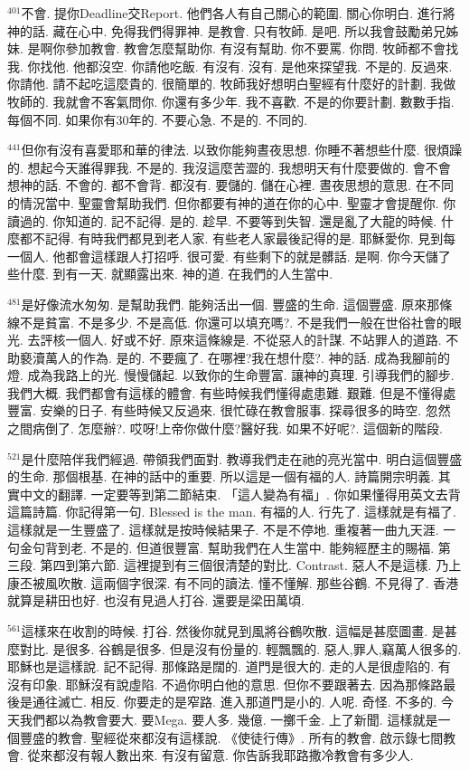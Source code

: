 \documentclass{book}
\begin{document}
$^{401}$不會.
提你Deadline交Report.
他們各人有自己關心的範圍.
關心你明白.
進行將神的話.
藏在心中.
免得我們得罪神.
是教會.
只有牧師.
是吧.
所以我會鼓勵弟兄姊妹.
是啊你參加教會.
教會怎麼幫助你.
有沒有幫助.
你不要罵.
你問.
牧師都不會找我.
你找他.
他都沒空.
你請他吃飯.
有沒有.
沒有.
是他來探望我.
不是的.
反過來.
你請他.
請不起吃這麼貴的.
很簡單的.
牧師我好想明白聖經有什麼好的計劃.
我做牧師的.
我就會不客氣問你.
你還有多少年.
我不喜歡.
不是的你要計劃.
數數手指.
每個不同.
如果你有30年的.
不要心急.
不是的.
不同的.

$^{441}$但你有沒有喜愛耶和華的律法.
以致你能夠晝夜思想.
你睡不著想些什麼.
很煩躁的.
想起今天誰得罪我.
不是的.
我沒這麼苦澀的.
我想明天有什麼要做的.
會不會想神的話.
不會的.
都不會背.
都沒有.
要儲的.
儲在心裡.
晝夜思想的意思.
在不同的情況當中.
聖靈會幫助我們.
但你都要有神的道在你的心中.
聖靈才會提醒你.
你讀過的.
你知道的.
記不記得.
是的.
趁早.
不要等到失智.
還是亂了大龍的時候.
什麼都不記得.
有時我們都見到老人家.
有些老人家最後記得的是.
耶穌愛你.
見到每一個人.
他都會這樣跟人打招呼.
很可愛.
有些剩下的就是髒話.
是啊.
你今天儲了些什麼.
到有一天.
就顯露出來.
神的道.
在我們的人生當中.

$^{481}$是好像流水匆匆.
是幫助我們.
能夠活出一個.
豐盛的生命.
這個豐盛.
原來那條線不是貧富.
不是多少.
不是高低.
你還可以填充嗎?.
不是我們一般在世俗社會的眼光.
去評核一個人.
好或不好.
原來這條線是.
不從惡人的計謀.
不站罪人的道路.
不助褻瀆萬人的作為.
是的.
不要瘋了.
在哪裡?我在想什麼?.
神的話.
成為我腳前的燈.
成為我路上的光.
慢慢儲起.
以致你的生命豐富.
讓神的真理.
引導我們的腳步.
我們大概.
我們都會有這樣的體會.
有些時候我們懂得處患難.
艱難.
但是不懂得處豐富.
安樂的日子.
有些時候又反過來.
很忙碌在教會服事.
探尋很多的時空.
忽然之間病倒了.
怎麼辦?.
哎呀!上帝你做什麼?醫好我.
如果不好呢?.
這個新的階段.

$^{521}$是什麼陪伴我們經過.
帶領我們面對.
教導我們走在祂的亮光當中.
明白這個豐盛的生命.
那個根基.
在神的話中的重要.
所以這是一個有福的人.
詩篇開宗明義.
其實中文的翻譯.
一定要等到第二節結束.
「這人變為有福」.
你如果懂得用英文去背這篇詩篇.
你記得第一句.
Blessed is the man.
有福的人.
行先了.
這樣就是有福了.
這樣就是一生豐盛了.
這樣就是按時候結果子.
不是不停地.
重複著一曲九天涯.
一句金句背到老.
不是的.
但道很豐富.
幫助我們在人生當中.
能夠經歷主的賜福.
第三段.
第四到第六節.
這裡提到有三個很清楚的對比.
Contrast.
惡人不是這樣.
乃上康丕被風吹散.
這兩個字很深.
有不同的讀法.
懂不懂解.
那些谷鶴.
不見得了.
香港就算是耕田也好.
也沒有見過人打谷.
還要是梁田萬頃.

$^{561}$這樣來在收割的時候.
打谷.
然後你就見到風將谷鶴吹散.
這幅是甚麼圖畫.
是甚麼對比.
是很多.
谷鶴是很多.
但是沒有份量的.
輕飄飄的.
惡人,罪人,竊萬人很多的.
耶穌也是這樣說.
記不記得.
那條路是闊的.
道門是很大的.
走的人是很虛陷的.
有沒有印象.
耶穌沒有說虛陷.
不過你明白他的意思.
但你不要跟著去.
因為那條路最後是通往滅亡.
相反.
你要走的是窄路.
進入那道門是小的.
人呢.
奇怪.
不多的.
今天我們都以為教會要大.
要Mega.
要人多.
幾億.
一擲千金.
上了新聞.
這樣就是一個豐盛的教會.
聖經從來都沒有這樣說.
《使徒行傳》.
所有的教會.
啟示錄七間教會.
從來都沒有報人數出來.
有沒有留意.
你告訴我耶路撒冷教會有多少人.
\end{document}
